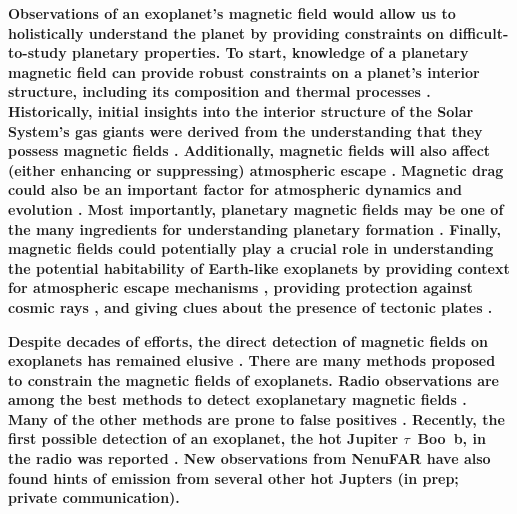  \textbf{Observations of an exoplanet's magnetic field would allow us to holistically understand the planet by providing constraints on difficult-to-study planetary properties. To start, knowledge of a planetary magnetic field can provide robust constraints on a planet's interior structure, including its composition and thermal processes \citep{G2015,Brain2024}. Historically, initial insights into the interior structure of the Solar System's gas giants were derived from the understanding that they possess magnetic fields \citep{Hubbard1973}. Additionally, magnetic fields will also affect (either enhancing or suppressing) atmospheric escape \citep{G2015,Zarka2018haex,Egan2019,Brain2024}. Magnetic drag could also be an important factor for atmospheric dynamics and evolution \citep{Perna2010a,Beltz2023}. Most importantly, planetary magnetic fields may be one of the many ingredients for understanding planetary formation \citep{Lovelace2008,Batygin2018,Jia2023}. Finally, magnetic fields could potentially play a crucial role in understanding the potential habitability of Earth-like exoplanets by providing context for atmospheric escape mechanisms \citep{Lazio2019,Zarka2018haex}, providing protection against cosmic rays \citep{Gr2015}, and giving clues about the presence of tectonic plates \citep{Shahar2019}. }

\textbf{Despite decades of efforts, the direct detection of magnetic fields on exoplanets has remained elusive \citep{G2015,Brain2024}. There are many methods proposed to constrain the magnetic fields of exoplanets. Radio observations are among the best methods to detect exoplanetary magnetic fields \citep{Zarka2007,Zarka2015SKA,G2015,Brain2024}. Many of the other methods are prone to false positives \citep{G2015,Turner2016a,Route2019}. Recently, the first possible detection of an exoplanet, the hot Jupiter $\tau$~Boo~b, in the radio was reported \citep{Turner2021}. New observations from NenuFAR have also found hints of emission from several other hot Jupters (in prep; private communication).}


